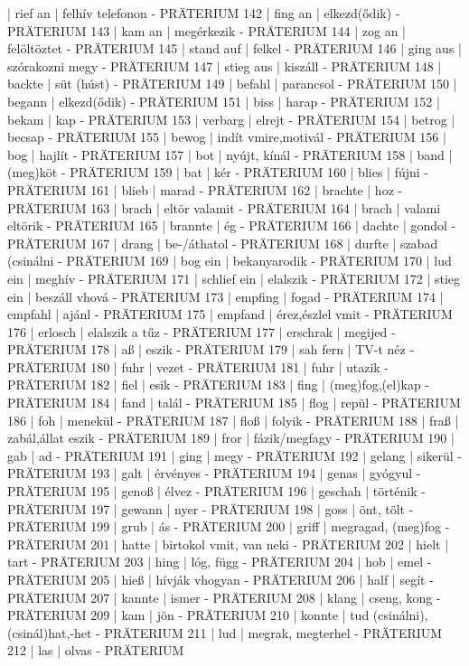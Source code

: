 \documentclass{article}
\newenvironment{exmp}{\verbatim}{\endverbatim}
\begin{document}
\begin{exmp}
141 | rief an | felhív telefonon - PRÄTERIUM
142 | fing an | elkezd(ődik) - PRÄTERIUM
143 | kam an  | megérkezik - PRÄTERIUM
144 | zog an | felöltöztet - PRÄTERIUM
145 | stand auf | felkel - PRÄTERIUM
146 | ging aus | szórakozni megy - PRÄTERIUM
147 | stieg aus | kiszáll - PRÄTERIUM
148 | backte | süt (húst) - PRÄTERIUM
149 | befahl | parancsol - PRÄTERIUM
150 | begann | elkezd(ődik) - PRÄTERIUM
151 | biss | harap - PRÄTERIUM
152 | bekam | kap - PRÄTERIUM
153 | verbarg | elrejt - PRÄTERIUM
154 | betrog | becsap - PRÄTERIUM
155 | bewog | indít vmire,motivál - PRÄTERIUM
156 | bog | hajlít - PRÄTERIUM
157 | bot | nyújt, kínál - PRÄTERIUM
158 | band | (meg)köt - PRÄTERIUM
159 | bat | kér - PRÄTERIUM
160 | blies | fújni - PRÄTERIUM
161 | blieb | marad - PRÄTERIUM
162 | brachte | hoz - PRÄTERIUM
163 | brach | eltör valamit - PRÄTERIUM
164 | brach | valami eltörik - PRÄTERIUM
165 | brannte | ég - PRÄTERIUM
166 | dachte | gondol - PRÄTERIUM
167 | drang | be-/áthatol - PRÄTERIUM
168 | durfte | szabad (csinálni - PRÄTERIUM
169 | bog ein | bekanyarodik - PRÄTERIUM
170 | lud ein | meghív - PRÄTERIUM
171 | schlief ein | elalszik - PRÄTERIUM
172 | stieg ein | beszáll vhová - PRÄTERIUM
173 | empfing | fogad - PRÄTERIUM
174 | empfahl | ajánl - PRÄTERIUM
175 | empfand | érez,észlel vmit - PRÄTERIUM
176 | erlosch | elalszik a tűz - PRÄTERIUM
177 | erschrak | megijed - PRÄTERIUM
178 | aß | eszik - PRÄTERIUM
179 | sah fern | TV-t néz - PRÄTERIUM
180 | fuhr | vezet - PRÄTERIUM
181 | fuhr  | utazik - PRÄTERIUM
182 | fiel | esik - PRÄTERIUM
183 | fing | (meg)fog,(el)kap - PRÄTERIUM
184 | fand | talál - PRÄTERIUM
185 | flog | repül - PRÄTERIUM
186 | foh | menekül - PRÄTERIUM
187 | floß | folyik - PRÄTERIUM
188 | fraß | zabál,állat eszik - PRÄTERIUM
189 | fror | fázik/megfagy - PRÄTERIUM
190 | gab | ad - PRÄTERIUM
191 | ging  | megy - PRÄTERIUM
192 | gelang | sikerül - PRÄTERIUM
193 | galt | érvényes - PRÄTERIUM
194 | genas | gyógyul - PRÄTERIUM
195 | genoß | élvez - PRÄTERIUM
196 | geschah | történik - PRÄTERIUM
197 | gewann | nyer - PRÄTERIUM
198 | goss | önt, tölt - PRÄTERIUM
199 | grub | ás - PRÄTERIUM
200 | griff | megragad, (meg)fog - PRÄTERIUM
201 | hatte | birtokol vmit, van neki - PRÄTERIUM
202 | hielt | tart - PRÄTERIUM
203 | hing | lóg, függ - PRÄTERIUM
204 | hob | emel - PRÄTERIUM
205 | hieß | hívják vhogyan - PRÄTERIUM
206 | half | segít - PRÄTERIUM
207 | kannte | ismer - PRÄTERIUM
208 | klang | cseng, kong - PRÄTERIUM
209 | kam | jön - PRÄTERIUM
210 | konnte | tud (csinálni), (csinál)hat,-het - PRÄTERIUM
211 | lud | megrak, megterhel  - PRÄTERIUM
212 | las | olvas - PRÄTERIUM

\end{exmp}
\end{document}
